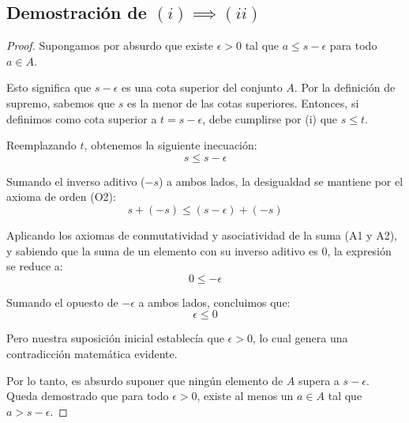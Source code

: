 \documentclass[11pt, a4paper]{article}
\begin{document}
	\subsection*{Demostración de $(i) \implies (ii)$}
	\begin{proof}
		Supongamos por absurdo que existe $\epsilon > 0$ tal que $a \leq s - \epsilon$ para todo $a \in A$.
		
		Esto significa que $s - \epsilon$ es una cota superior del conjunto $A$. Por la definición de supremo, sabemos que $s$ es la menor de las cotas superiores. Entonces, si definimos como cota superior a $t = s - \epsilon$, debe cumplirse por (i) que $s \leq t$.
		
		Reemplazando $t$, obtenemos la siguiente inecuación:
		\[
		s \leq s - \epsilon
		\]
		
		Sumando el inverso aditivo ($-s$) a ambos lados, la desigualdad se mantiene por el axioma de orden (O2):
		\[
		s + (-s) \leq (s - \epsilon) + (-s)
		\]
		
		Aplicando los axiomas de conmutatividad y asociatividad de la suma (A1 y A2), y sabiendo que la suma de un elemento con su inverso aditivo es $0$, la expresión se reduce a:
		\[
		0 \leq -\epsilon
		\]
		
		Sumando el opuesto de $-\epsilon$ a ambos lados, concluimos que:
		\[
		\epsilon \leq 0
		\]
		
		Pero nuestra suposición inicial establecía que $\epsilon > 0$, lo cual genera una contradicción matemática evidente. 
		
		Por lo tanto, es absurdo suponer que ningún elemento de $A$ supera a $s - \epsilon$. Queda demostrado que para todo $\epsilon > 0$, existe al menos un $a \in A$ tal que $a > s - \epsilon$.
	\end{proof}
	
	\vspace{0.5cm}
	
\end{document}
